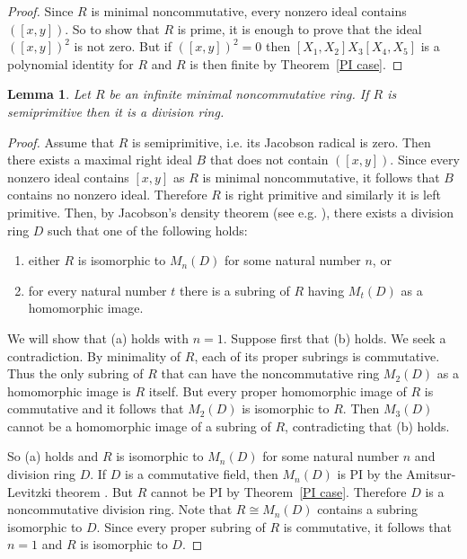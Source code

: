 \documentclass[11pt]{article}
\newtheorem{lemma}[corollary]{Lemma}
\theoremstyle{definition}
\begin{document}
\begin{proof}
Since $R$ is minimal noncommutative, every nonzero ideal contains $([x,y])$. So to show that $R$ is prime, it is enough to prove that the ideal $([x,y])^2$ is not zero. But if $([x,y])^2=0$ then $[X_1,X_2]X_3[X_4,X_5]$ is a polynomial identity for $R$ and $R$ is then finite by Theorem~\ref{PI case}.
\end{proof}

\begin{lemma}\label{SemiprimitiveIsDivisionRing}
Let $R$ be an infinite minimal noncommutative ring. If $R$ is semiprimitive then it is a division ring.
\end{lemma}

\begin{proof}
Assume that $R$ is semiprimitive, i.e. its Jacobson radical is zero. Then there exists a maximal right ideal $B$ that does not contain $([x,y])$. Since every nonzero ideal contains $[x,y]$ as $R$ is minimal noncommutative, it follows that $B$ contains no nonzero ideal. Therefore $R$ is right primitive and similarly it is left primitive. Then, by Jacobson's density theorem (see e.g. \cite[Corollary~0.3.7]{McConnell-Robson}), there exists a division ring $D$ such that one of the following holds:
\begin{enumerate}[topsep=0pt]
\item[(a)] either $R$ is isomorphic to $M_n(D)$ for some natural number $n$, or
\item[(b)] for every natural number $t$ there is a subring of $R$ having $M_t(D)$ as a homomorphic image.
\end{enumerate}
We will show that (a) holds with $n=1$. Suppose first that (b) holds. We seek a contradiction. By minimality of $R$, each of its proper subrings is commutative. Thus the only subring of $R$ that can have the noncommutative ring $M_2(D)$ as a homomorphic image is $R$ itself. But every proper homomorphic image of $R$ is commutative and it follows that $M_2(D)$ is isomorphic to $R$. Then $M_3(D)$ cannot be a homomorphic image of a subring of $R$, contradicting that (b) holds.

So (a) holds and $R$ is isomorphic to $M_n(D)$ for some natural number $n$ and division ring $D$. If $D$ is a commutative field, then $M_n(D)$ is PI by the Amitsur-Levitzki theorem \cite[Theorem~1]{Standidformatrices}. But $R$ cannot be PI by Theorem~\ref{PI case}. Therefore $D$ is a noncommutative division ring. Note that $R\cong M_n(D)$ contains a subring isomorphic to $D$. Since every proper subring of $R$ is commutative, it follows that $n=1$ and $R$ is isomorphic to $D$.
\end{proof}
\end{document}
